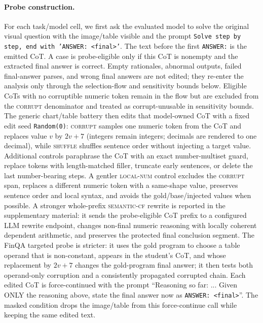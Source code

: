 \documentclass[11pt]{article}
\newcommand{\corrupt}{\textsc{corrupt}}
\newcommand{\shuffle}{\textsc{shuffle}}
\newcommand{\localnum}{\textsc{local-num}}
\newcommand{\semanticcf}{\textsc{semantic-cf}}
\begin{document}
\paragraph{Probe construction.}
For each task/model cell, we first ask the evaluated model to solve the original visual question with the image/table visible and the prompt \texttt{Solve step by step, end with 'ANSWER: <final>'}. The text before the first \texttt{ANSWER:} is the emitted CoT. A case is probe-eligible only if this CoT is nonempty and the extracted final answer is correct. Empty rationales, abnormal outputs, failed final-answer parses, and wrong final answers are not edited; they re-enter the analysis only through the selection-flow and sensitivity bounds below. Eligible CoTs with no corruptible numeric token remain in the flow but are excluded from the \corrupt{} denominator and treated as corrupt-unusable in sensitivity bounds. The generic chart/table battery then edits that model-owned CoT with a fixed edit seed \texttt{Random(0)}: \corrupt{} samples one numeric token from the CoT and replaces value $v$ by $2v+7$ (integers remain integers; decimals are rendered to one decimal), while \shuffle{} shuffles sentence order without injecting a target value. Additional controls paraphrase the CoT with an exact number-multiset guard, replace tokens with length-matched filler, truncate early sentences, or delete the last number-bearing steps. A gentler \localnum{} control excludes the \corrupt{} span, replaces a different numeric token with a same-shape value, preserves sentence order and local syntax, and avoids the gold/base/injected values when possible. A stronger whole-prefix \semanticcf{} rewrite is reported in the supplementary material: it sends the probe-eligible CoT prefix to a configured LLM rewrite endpoint, changes non-final numeric reasoning with locally coherent dependent arithmetic, and preserves the protected final conclusion segment. The FinQA targeted probe is stricter: it uses the gold program to choose a table operand that is non-constant, appears in the student's CoT, and whose replacement by $2v+7$ changes the gold-program final answer; it then tests both operand-only corruption and a consistently propagated corrupted chain. Each edited CoT is force-continued with the prompt ``Reasoning so far: ... Given ONLY the reasoning above, state the final answer now as \texttt{ANSWER: <final>}''. The masked condition drops the image/table from this force-continue call while keeping the same edited text.
\end{document}
